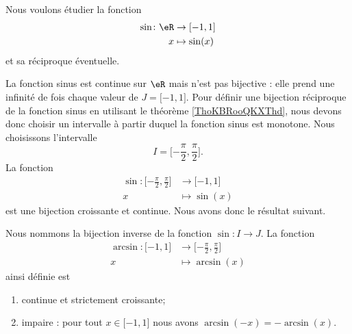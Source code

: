 Nous voulons étudier la fonction
\begin{equation}
    \begin{aligned}
        \sin\colon \eR&\to \mathopen[ -1 , 1 \mathclose] \\
        x&\mapsto \sin(x) 
    \end{aligned}
\end{equation}
et sa réciproque éventuelle.

La fonction sinus est continue sur \( \eR\) mais n'est pas bijective : elle prend une infinité de fois chaque valeur de \( J=\mathopen[ -1 , 1 \mathclose]\). Pour définir une bijection réciproque de la fonction sinus en utilisant le théorème \ref{ThoKBRooQKXThd}, nous devons donc choisir un intervalle à partir duquel la fonction sinus est monotone. Nous choisissons l'intervalle
\begin{equation}
    I=\mathopen[ -\frac{ \pi }{ 2 } , \frac{ \pi }{2} \mathclose].
\end{equation}
La fonction
\begin{equation}
    \begin{aligned}
        \sin\colon \mathopen[ -\frac{ \pi }{2} , \frac{ \pi }{2} \mathclose]&\to \mathopen[ -1 , 1 \mathclose] \\
        x&\mapsto \sin(x) 
    \end{aligned}
\end{equation}
est une bijection croissante et continue. Nous avons donc le résultat suivant.
\begin{theorem}
    Nous nommons  la bijection inverse de la fonction \( \sin\colon I\to J\). La fonction
    \begin{equation}
        \begin{aligned}
            \arcsin\colon \mathopen[ -1 , 1 \mathclose]&\to \mathopen[ -\frac{ \pi }{2} , \frac{ \pi }{2} \mathclose] \\
            x&\mapsto \arcsin(x) 
        \end{aligned}
    \end{equation}
    ainsi définie est
    \begin{enumerate}
        \item
            continue et strictement croissante;
        \item
            impaire : pour tout \( x\in\mathopen[ -1 , 1 \mathclose]\) nous avons \( \arcsin(-x)=-\arcsin(x)\).
    \end{enumerate}
\end{theorem}

